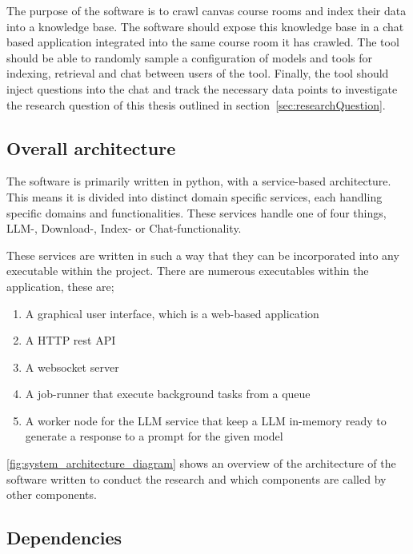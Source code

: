 The purpose of the software is to crawl canvas course rooms and index their data into a knowledge base. The software should expose this knowledge base in a chat based application integrated into the same course room it has crawled. The tool should be able to randomly sample a configuration of models and tools for indexing, retrieval and chat between users of the tool. Finally, the tool should inject questions into the chat and track the necessary data points to investigate the research question of this thesis outlined in section~\ref{sec:researchQuestion}.


\subsection{Overall architecture}


The software is primarily written in python, with a service-based architecture. This means it is divided into distinct domain specific services, each handling specific domains and functionalities. These services handle one of four things, \gls{LLM}-, Download-, Index- or Chat-functionality.


These services are written in such a way that they can be incorporated into any executable within the project. There are numerous executables within the application, these are;


\begin{enumerate}
        \item A graphical user interface, which is a web-based application
        \item A HTTP rest API
        \item A websocket server
        \item A job-runner that execute background tasks from a queue
        \item A worker node for the \gls{LLM} service that keep a \gls{LLM} in-memory ready to generate a response to a prompt for the given model
\end{enumerate}


\autoref{fig:system_architecture_diagram} shows an overview of the architecture of the software written to conduct the research and which components are called by other components.





\subsection{Dependencies}


